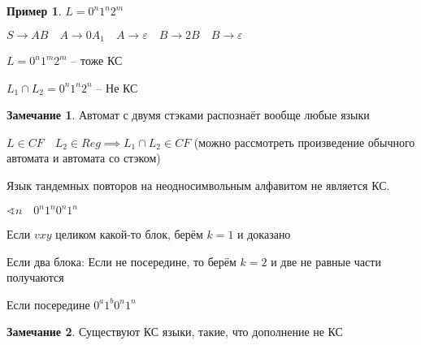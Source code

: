 \documentclass{book}
\theoremstyle{definition}
\newtheorem*{note}{Замечание}
\newtheorem*{example}{Пример}
\begin{document}
\begin{example}
    $L = 0^n 1^n 2^m$

    $S \to AB\quad A \to 0A_1\quad A \to \varepsilon\quad B \to 2 B\quad B \to  \varepsilon$

    $L = 0^n 1^m 2^m$ -- тоже КС

     $L_1 \cap L_2 = 0^n 1^n 2^n$ -- Не КС
\end{example}

\begin{note}
    Автомат с двумя стэками распознаёт вообще любые языки
\end{note}

\begin{theorem}
    $L\in CF\quad L_2\in Reg \implies L_1\cap L_2\in CF$ (можно рассмотреть произведение обычного автомата и автомата со стэком)
\end{theorem}

\begin{theorem}
    Язык тандемных повторов на неодносимвольным алфавитом не является КС.

    $\sphericalangle n\quad 0^n 1^n 0^n 1^n$

    Если $vxy$ целиком какой-то блок, берём  $k=1$ и доказано

    Если два блока: 
    Если не посередине, то берём $k=2$ и две не равные части получаются

    Если посередине  $0^a 1^b 0^n 1^n\quad$
\end{theorem}

\begin{note}
    Существуют КС языки, такие, что дополнение не КС
\end{note}
\end{document}
